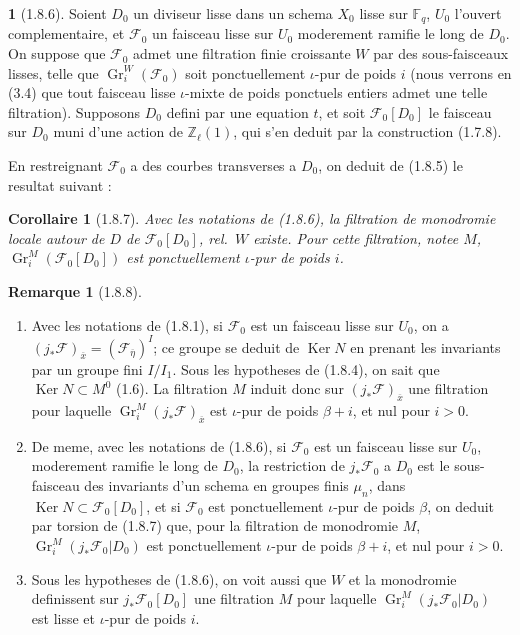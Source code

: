 \documentclass[12pt,a4paper]{article}
\theoremstyle{plain}
\newtheorem{corollaire}[theorem]{Corollaire}
\theoremstyle{definition}
\newtheorem{remarque}[theorem]{Remarque}
\theoremstyle{definition}
\newtheorem{para}{}[section]
\theoremstyle{remark}
\DeclareMathOperator{\Gr}{Gr}
\DeclareMathOperator{\Ker}{Ker}
\begin{document}
\begin{para}[1.8.6]
Soient $D_0$ un diviseur lisse dans un schema $X_0$ lisse sur $\mathbb{F}_q$, $U_0$ l'ouvert complementaire, et $\mathscr{F}_0$ un faisceau lisse sur $U_0$ moderement ramifie le long de $D_0$. On suppose que $\mathscr{F}_0$ admet une filtration finie croissante $W$ par des sous-faisceaux lisses, telle que $\Gr_i^W(\mathscr{F}_0)$ soit ponctuellement $\iota$-pur de poids $i$ (nous verrons en (3.4) que tout faisceau lisse $\iota$-mixte de poids ponctuels entiers admet une telle filtration). Supposons $D_0$ defini par une equation $t$, et soit $\mathscr{F}_0[D_0]$ le faisceau sur $D_0$ muni d'une action de $\mathbb{Z}_\ell(1)$, qui s'en deduit par la construction (1.7.8).
\end{para}

En restreignant $\mathscr{F}_0$ a des courbes transverses a $D_0$, on deduit de (1.8.5) le resultat suivant :

\begin{corollaire}[1.8.7]
Avec les notations de (1.8.6), la filtration de monodromie locale autour de $D$ de $\mathscr{F}_0[D_0]$, rel.~$W$ existe. Pour cette filtration, notee $M$, $\Gr_i^M(\mathscr{F}_0[D_0])$ est ponctuellement $\iota$-pur de poids $i$.
\end{corollaire}

\begin{remarque}[1.8.8]
$\;$
\begin{enumerate}[nosep]
\item[1)] Avec les notations de (1.8.1), si $\mathscr{F}_0$ est un faisceau lisse sur $U_0$, on a $(j_* \mathscr{F})_{\overline{x}} = (\mathscr{F}_{\overline{\eta}})^I$; ce groupe se deduit de $\Ker N$ en prenant les invariants par un groupe fini $I/I_1$. Sous les hypotheses de (1.8.4), on sait que $\Ker N \subset M^0$ (1.6). La filtration $M$ induit donc sur $(j_* \mathscr{F})_{\overline{x}}$ une filtration pour laquelle $\Gr_i^M(j_* \mathscr{F})_{\overline{x}}$ est $\iota$-pur de poids $\beta + i$, et nul pour $i > 0$.
\item[2)] De meme, avec les notations de (1.8.6), si $\mathscr{F}_0$ est un faisceau lisse sur $U_0$, moderement ramifie le long de $D_0$, la restriction de $j_* \mathscr{F}_0$ a $D_0$ est le sous-faisceau des invariants d'un schema en groupes finis $\mu_n$, dans $\Ker N \subset \mathscr{F}_0[D_0]$, et si $\mathscr{F}_0$ est ponctuellement $\iota$-pur de poids $\beta$, on deduit par torsion de (1.8.7) que, pour la filtration de monodromie $M$, $\Gr_i^M(j_* \mathscr{F}_0|D_0)$ est ponctuellement $\iota$-pur de poids $\beta + i$, et nul pour $i > 0$.
\item[3)] Sous les hypotheses de (1.8.6), on voit aussi que $W$ et la monodromie definissent sur $j_* \mathscr{F}_0[D_0]$ une filtration $M$ pour laquelle $\Gr_i^M(j_* \mathscr{F}_0|D_0)$ est lisse et $\iota$-pur de poids $i$.
\end{enumerate}
\end{remarque}
\end{document}
